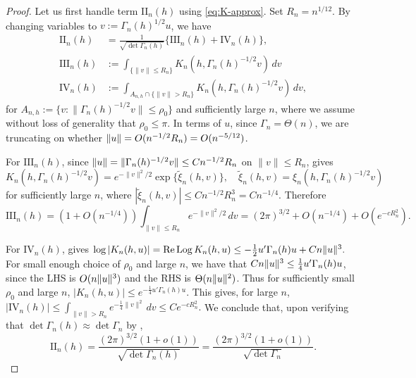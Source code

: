 \documentclass[12pt,reqno]{amsart}
\DeclareMathOperator{\Log}{Log} %
\begin{document}
\begin{proof}
Let us first handle term $\mathrm{II}_n(h)$ using \eqref{eq:K-approx}. Set $R_n = n^{1/12}$.
By changing variables to
\(v := \Gamma_n(h)^{1/2} u\),
we have
\begin{align*}
\mathrm{II}_n(h)&=\frac{1}{\sqrt{\det\Gamma_n(h)}}\{\mathrm{III}_n(h)+\mathrm{IV}_n(h)\},\\
\mathrm{III}_n(h)&:=\int_{\{\|v\|\le R_n\}}K_n(h,\Gamma_n(h)^{-1/2}v)\,dv \\
\mathrm{IV}_n(h)&:=\int_{A_{n,h}\cap\{\|v\|>R_n\}}
K_n(h,\Gamma_n(h)^{-1/2}v)\,dv,
\end{align*}
for $A_{n,h}:=\{v:\|\Gamma_n(h)^{-1/2}v\|\le \rho_0\}$ and sufficiently large $n$,
where we assume without loss of generality that $\rho_0 \leq \pi$.
In terms of $u$, since $\Gamma_n
= \Theta(n)$, we are truncating on whether $\lVert u\rVert = O(n^{-1/2} R_n) = O(n^{-5/12})$.


For \(\mathrm{III}_n(h)\), since \(\lVert u\rVert = \|\Gamma_n(h)^{-1/2}v\|\le Cn^{-1/2}R_n\) on
\(\|v\|\le R_n\),
 gives
\[
K_n(h,\Gamma_n(h)^{-1/2}v)
=e^{-\|v\|^2/2}\exp\{\widetilde \xi_n(h,v)\}, \quad \tilde \xi_n(h, v) = \xi_n(h, \Gamma_n(h)^
{-1/2} v)
\]
for sufficiently large $n$,
where
$
|\widetilde \xi_n(h,v)|\le Cn^{-1/2}R_n^3=Cn^{-1/4}.
$
Therefore
\[
\mathrm{III}_n(h)
= (1+O(n^{-1/4})) \int_{\|v\|\le R_n}e^{-\|v\|^2/2}\,dv
=(2\pi)^{3/2}+O(n^{-1/4})+O(e^{-cR_n^2}).
\]

For \(\mathrm{IV}_n(h)\),   gives \(
\log |K_n(h,u)| = \Re \Log K_n(h,u) \le -\frac{1}{2} u' \Gamma_n(h) u + Cn\norm{u}^3.
\)
For small enough choice of $\rho_0$ and large $n$, we have that $C n\lVert u\rVert^3 \le \frac{1}{4} u'
\Gamma_n(h) u$, since the LHS is $O(n \lVert u\rVert^3)$ and the RHS is $\Theta(n \lVert u\rVert^2)$. Thus
for sufficiently small $\rho_0$ and large $n$, $|K_n(h,u)| \le e^{-\frac{1}{4}u' \Gamma_n(h) u}$. This gives, for large $n$,
\(
|\mathrm{IV}_n(h)|
\le
\int_{\|v\|>R_n}e^{-\frac{1}{4} \|v\|^2}\,dv
\le C e^{-c R_n^2}.
\)
We conclude that, upon verifying that $\det \Gamma_n(h) \approx \det \Gamma_n$ by , \[
	\mathrm{II}_n(h) = \frac{(2\pi)^{3/2} (1+o(1))}{\sqrt{\det \Gamma_n(h)}} = \frac{(2\pi)^{3/2}
	(1+o(1))} {\sqrt{\det \Gamma_n}}.
\]


\end{proof}
\end{document}
